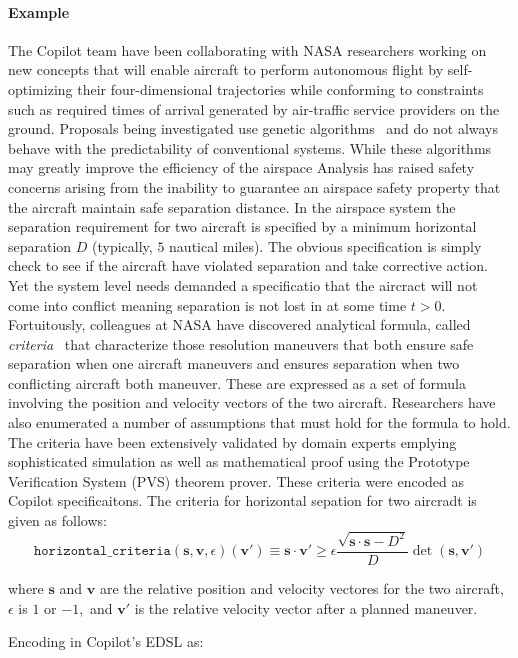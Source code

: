 \paragraph{Example} The Copilot team have been collaborating with NASA
researchers working on new concepts that will enable aircraft to
perform autonomous flight by self-optimizing their four-dimensional
trajectories while conforming to constraints such as required times of
arrival generated by air-traffic service providers on the
ground. Proposals being investigated use genetic
algorithms~\cite{KarrVRC} and do not always behave with the
predictability of conventional systems. While these algorithms may
greatly improve the efficiency of the airspace Analysis has raised
safety concerns arising from the inability to guarantee an airspace
safety property that the aircraft maintain safe separation
distance. In the airspace system the separation requirement for two
aircraft is specified by a minimum horizontal separation $D$
(typically, $5$ nautical miles).  The obvious specification is
simply check to see if the aircraft have violated separation and take
corrective action.  Yet the system level needs demanded a specificatio
that the aircract will not come into conflict meaning separation is
not lost in at some time $t>0.$  Fortuitously,
colleagues at NASA have discovered analytical formula, called
\emph{criteria}~\cite{NM2011NASA,NMH14ATIO} that characterize those resolution maneuvers that both
ensure safe separation when one aircraft maneuvers and ensures
separation when two conflicting aircraft both
maneuver. These are expressed as a set of formula
involving the position and velocity vectors of the two
aircraft. Researchers have also enumerated a number of assumptions
that must hold for the formula to hold. The criteria have been
extensively validated  by domain experts emplying  sophisticated simulation as well as mathematical proof
using the Prototype Verification System (PVS) theorem prover. These
criteria were encoded as Copilot specificaitons. The criteria for
horizontal sepation for two aircradt  is given as follows:
$$ \texttt{horizontal\_criteria}(\bm{s}, \bm{v}, \epsilon)(\bm{v'})
\equiv  \bm{s} \cdot \bm{v'} \geq \epsilon  \frac{\sqrt{\bm{s} \cdot
  \bm{s}  - D^2}} {D} \operatorname{det}(\bm{s},\bm{v'})$$ 

where $\bm{s}$ and $\bm{v}$ are the  relative position and velocity
vectores for the two aircraft, $\epsilon$ is $1$ or $-1,$  and 
$\bm{v'}$ is the relative velocity vector after a planned maneuver. 

Encoding in  Copilot's EDSL as:

